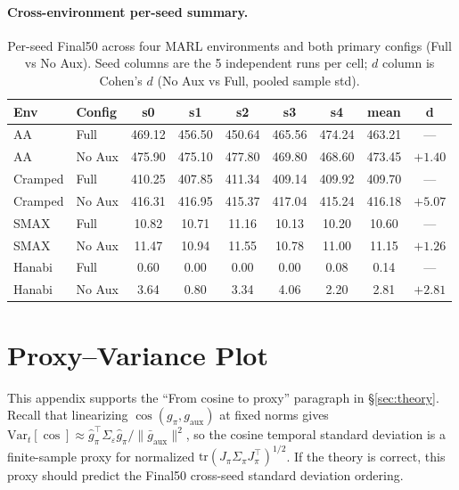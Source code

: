 \documentclass{article}
\theoremstyle{plain}
\theoremstyle{definition}
\theoremstyle{remark}
\begin{document}
\paragraph{Cross-environment per-seed summary.}

\begin{table}[H]
\centering
\small
\caption{Per-seed Final50 across four MARL environments and both primary configs (Full vs No Aux). Seed columns are the 5 independent runs per cell; $d$ column is Cohen's $d$ (No Aux vs Full, pooled sample std).}
\label{tab:cross_env_perseed}
\setlength{\tabcolsep}{4pt}
\begin{tabular}{llccccccc}
\toprule
\textbf{Env} & \textbf{Config} & \textbf{s0} & \textbf{s1} & \textbf{s2} & \textbf{s3} & \textbf{s4} & \textbf{mean} & \textbf{d} \\
\midrule
AA        & Full   & 469.12 & 456.50 & 450.64 & 465.56 & 474.24 & 463.21 & --- \\
AA        & No Aux & 475.90 & 475.10 & 477.80 & 469.80 & 468.60 & 473.45 & $+1.40$ \\
\addlinespace
Cramped   & Full   & 410.25 & 407.85 & 411.34 & 409.14 & 409.92 & 409.70 & --- \\
Cramped   & No Aux & 416.31 & 416.95 & 415.37 & 417.04 & 415.24 & 416.18 & $+5.07$ \\
\addlinespace
SMAX      & Full   & 10.82  & 10.71  & 11.16  & 10.13  & 10.20  & 10.60  & --- \\
SMAX      & No Aux & 11.47  & 10.94  & 11.55  & 10.78  & 11.00  & 11.15  & $+1.26$ \\
\addlinespace
Hanabi    & Full   & 0.60   & 0.00   & 0.00   & 0.00   & 0.08   & 0.14   & --- \\
Hanabi    & No Aux & 3.64   & 0.80   & 3.34   & 4.06   & 2.20   & 2.81   & $+2.81$ \\
\bottomrule
\end{tabular}
\end{table}


\section{Proxy--Variance Plot}
\label{app:proxy}

This appendix supports the ``From cosine to proxy'' paragraph in
\S\ref{sec:theory}. Recall that linearizing $\cos(g_\pi,
g_{\mathrm{aux}})$ at fixed norms gives
$\mathrm{Var}_t[\cos] \approx \hat g_\pi^\top \Sigma_\varepsilon
\hat g_\pi / \|\bar g_{\mathrm{aux}}\|^2$, so the cosine temporal
standard deviation is a finite-sample proxy for normalized
$\mathrm{tr}(J_\pi \Sigma_\pi J_\pi^\top)^{1/2}$. If the theory is
correct, this proxy should predict the Final50 cross-seed standard
deviation ordering.
\end{document}

